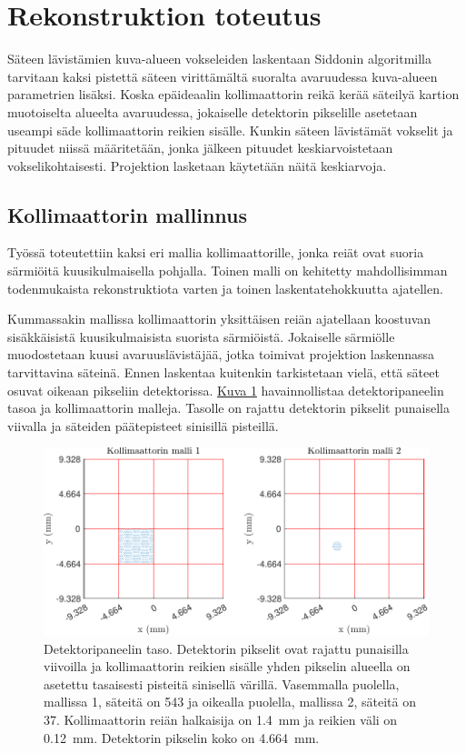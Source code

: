 \section{Rekonstruktion toteutus}
Säteen lävistämien kuva-alueen vokseleiden laskentaan Siddonin algoritmilla tarvitaan kaksi pistettä säteen virittämältä suoralta avaruudessa kuva-alueen parametrien lisäksi\cite{sundermann_fast_1998}. Koska epäideaalin kollimaattorin reikä kerää säteilyä kartion muotoiselta alueelta avaruudessa, jokaiselle detektorin pikselille asetetaan useampi säde kollimaattorin reikien sisälle. Kunkin säteen lävistämät vokselit ja pituudet niissä määritetään, jonka jälkeen pituudet keskiarvoistetaan vokselikohtaisesti. Projektion lasketaan käytetään näitä keskiarvoja.

\subsection{Kollimaattorin mallinnus}
Työssä toteutettiin kaksi eri mallia kollimaattorille, jonka reiät ovat suoria särmiöitä kuusikulmaisella pohjalla. Toinen malli on kehitetty mahdollisimman todenmukaista rekonstruktiota varten ja toinen laskentatehokkuutta ajatellen.

Kummassakin mallissa kollimaattorin yksittäisen reiän ajatellaan koostuvan sisäkkäisistä kuusikulmaisista suorista särmiöistä. Jokaiselle särmiölle muodostetaan kuusi avaruuslävistäjää, jotka toimivat projektion laskennassa tarvittavina säteinä. Ennen laskentaa kuitenkin tarkistetaan vielä, että säteet osuvat oikeaan pikseliin detektorissa. \hyperref[fig:ray1]{Kuva \ref*{fig:ray1}} havainnollistaa detektoripaneelin tasoa ja kollimaattorin malleja. Tasolle on rajattu detektorin pikselit punaisella viivalla ja säteiden päätepisteet sinisillä pisteillä.

\begin{figure}[t]
    \centering
    \captionsetup{width=.9\textwidth}
    \includegraphics[width=.9\textwidth]{kuvat/2d-kollimaattori.pdf}
    \caption{Detektoripaneelin taso. Detektorin pikselit ovat rajattu punaisilla viivoilla ja kollimaattorin reikien sisälle yhden pikselin alueella on asetettu tasaisesti pisteitä sinisellä värillä. Vasemmalla puolella, mallissa 1, säteitä on 543 ja oikealla puolella, mallissa 2, säteitä on 37. Kollimaattorin reiän halkaisija on \qty{1.4}{\milli\meter} ja reikien väli on \qty{0.12}{\milli\meter}. Detektorin pikselin koko on \qty{4.664}{\milli\meter}.}
    \label{fig:ray1}
\end{figure}

